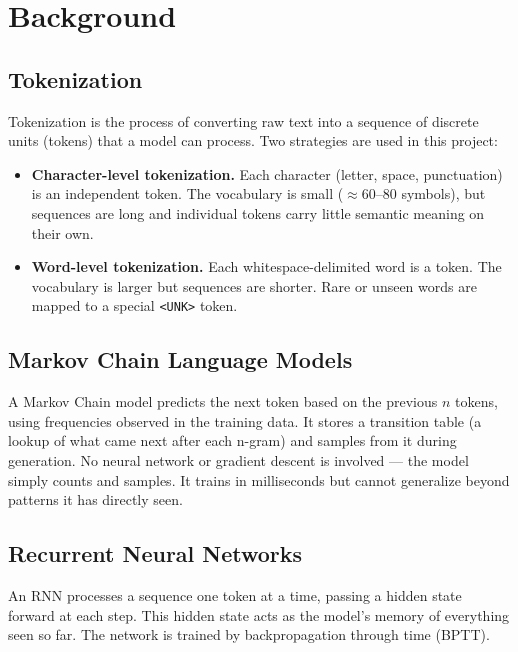 \section{Background}
\label{sec:background}

\subsection{Tokenization}

Tokenization is the process of converting raw text into a sequence of discrete
units (tokens) that a model can process. Two strategies are used in this project:

\begin{itemize}
    \item \textbf{Character-level tokenization.} Each character (letter, space,
          punctuation) is an independent token. The vocabulary is small
          ($\approx$60--80 symbols), but sequences are long and individual tokens
          carry little semantic meaning on their own.

    \item \textbf{Word-level tokenization.} Each whitespace-delimited word is a
          token. The vocabulary is larger but sequences are shorter. Rare or unseen
          words are mapped to a special \texttt{<UNK>} token.
\end{itemize}

\subsection{Markov Chain Language Models}

A Markov Chain model predicts the next token based on the previous $n$ tokens,
using frequencies observed in the training data. It stores a transition table
(a lookup of what came next after each n-gram) and samples from it during
generation. No neural network or gradient descent is involved — the model simply
counts and samples. It trains in milliseconds but cannot generalize beyond
patterns it has directly seen.

\subsection{Recurrent Neural Networks}

An RNN processes a sequence one token at a time, passing a hidden state forward
at each step. This hidden state acts as the model's memory of everything seen so
far. The network is trained by backpropagation through time (BPTT).

